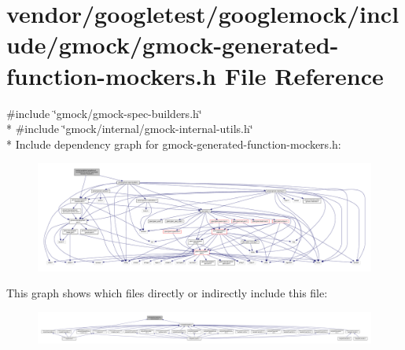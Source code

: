 \hypertarget{gmock-generated-function-mockers_8h}{}\section{vendor/googletest/googlemock/include/gmock/gmock-\/generated-\/function-\/mockers.h File Reference}
\label{gmock-generated-function-mockers_8h}
{\ttfamily \#include \char`\"{}gmock/gmock-\/spec-\/builders.\+h\char`\"{}}\\*
{\ttfamily \#include \char`\"{}gmock/internal/gmock-\/internal-\/utils.\+h\char`\"{}}\\*
Include dependency graph for gmock-\/generated-\/function-\/mockers.h\+:\nopagebreak
\begin{figure}[H]
\begin{center}
\leavevmode
\includegraphics[width=350pt]{gmock-generated-function-mockers_8h__incl}
\end{center}
\end{figure}
This graph shows which files directly or indirectly include this file\+:\nopagebreak
\begin{figure}[H]
\begin{center}
\leavevmode
\includegraphics[width=350pt]{gmock-generated-function-mockers_8h__dep__incl}
\end{center}
\end{figure}
